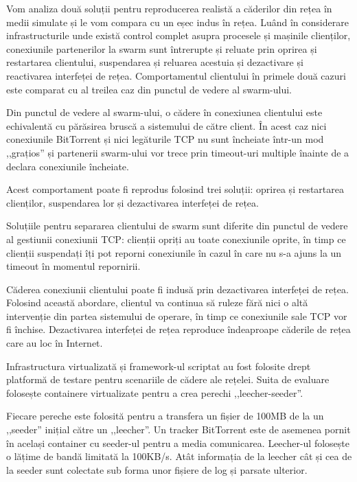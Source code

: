 Vom analiza două soluții pentru reproducerea realistă a căderilor din rețea
în medii simulate și le vom compara cu un eșec indus în rețea. Luând în
considerare infrastructurile unde există control complet asupra procesele
și mașinile clienților, conexiunile partenerilor la swarm sunt întrerupte
și reluate prin oprirea și restartarea clientului, suspendarea și reluarea
acestuia și dezactivare și reactivarea interfeței de rețea. Comportamentul
clientului în primele două cazuri este comparat cu al treilea caz din
punctul de vedere al swarm-ului.

Din punctul de vedere al swarm-ului, o cădere în conexiunea clientului
este echivalentă cu părăsirea bruscă a sistemului de către client.
În acest caz nici conexiunile BitTorrent și nici legăturile TCP nu sunt
încheiate într-un mod ,,grațios'' și partenerii swarm-ului vor trece
prin timeout-uri multiple înainte de a declara conexiunile încheiate.

Acest comportament poate fi reprodus folosind trei soluții: oprirea
și restartarea clienților, suspendarea lor și dezactivarea interfeței
de rețea.

Soluțiile pentru separarea clientului de swarm sunt diferite din
punctul de vedere al gestiunii conexiunii TCP: clienții opriți au toate
conexiunile oprite, în timp ce clienții suspendați îți pot reporni
conexiunile în cazul în care nu s-a ajuns la un timeout în momentul
repornirii.

Căderea conexiunii clientului poate fi indusă prin dezactivarea interfeței
de rețea. Folosind această abordare, clientul va continua să ruleze fără
nici o altă intervenție din partea sistemului de operare, în timp ce
conexiunile sale TCP vor fi închise. Dezactivarea interfeței de rețea
reproduce îndeaproape căderile de rețea care au loc în Internet.

Infrastructura virtualizată și framework-ul scriptat au fost folosite
drept platformă de testare pentru scenariile de cădere ale rețelei.
Suita de evaluare folosește containere virtualizate pentru a crea
perechi ,,leecher-seeder''.

Fiecare pereche este folosită pentru a transfera un fișier de 100MB
de la un ,,seeder'' inițial către un ,,leecher''. Un tracker BitTorrent
este de asemenea pornit în același container cu seeder-ul pentru a media
comunicarea. Leecher-ul folosește o lățime de bandă limitată la 100KB/s.
Atât informația de la leecher cât și cea de la seeder sunt colectate
sub forma unor fișiere de log și parsate ulterior.

